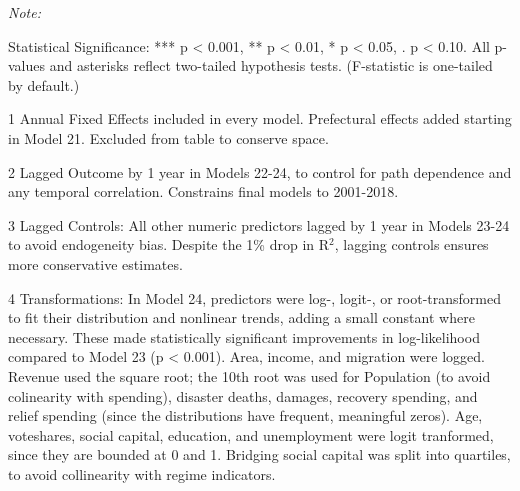 \documentclass[preprint, 3p,
authoryear]{elsarticle} %
\begin{document}
\begin{landscape}
\renewcommand{\arraystretch}{1}

\newpage

\renewcommand{\baselinestretch}{0.5}\selectfont
\renewcommand{\arraystretch}{1.5}

\begingroup\fontsize{10}{12}\selectfont

\begin{ThreePartTable}
\begin{TableNotes}
\item \textit{Note: } 
\item Statistical Significance: *** p < 0.001, ** p < 0.01, * p < 0.05, . p < 0.10. All p-values and asterisks reflect two-tailed hypothesis tests. (F-statistic is one-tailed by default.)
\item[1] Annual Fixed Effects included in every model. Prefectural effects added starting in Model 21. Excluded from table to conserve space.
\item[2] Lagged Outcome by 1 year in Models 22-24, to control for path dependence and any temporal correlation. Constrains final models to 2001-2018.
\item[3] Lagged Controls: All other numeric predictors lagged by 1 year in Models 23-24 to avoid endogeneity bias. Despite the 1\% drop in R$^{2}$, lagging controls ensures more conservative estimates.
\item[4] Transformations: In Model 24, predictors were log-, logit-, or root-transformed to fit their distribution and nonlinear trends, adding a small constant where necessary. These made statistically significant improvements in log-likelihood compared to Model 23 (p < 0.001). Area, income, and migration were logged. Revenue used the square root; the 10th root was used for Population (to avoid colinearity with spending), disaster deaths, damages, recovery spending, and relief spending (since the distributions have frequent, meaningful zeros). Age, voteshares, social capital, education, and unemployment were logit tranformed, since they are bounded at 0 and 1. Bridging social capital was split into quartiles, to avoid collinearity with regime indicators.
\end{TableNotes}
\begin{longtabu} to 

\end{longtabu}
\end{ThreePartTable}
\end{landscape}
\end{document}
